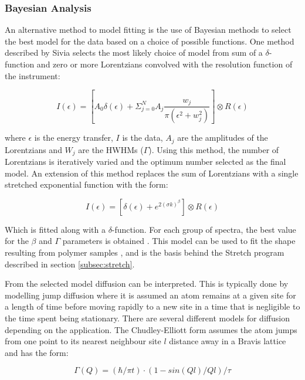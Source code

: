 \documentclass[paper=a4, fontsize=11pt]{scrartcl}	%
\numberwithin{equation}{section}															%
\numberwithin{figure}{section}																%
\numberwithin{table}{section}																%
\begin{document}
\subsubsection{Bayesian Analysis}
An alternative method to model fitting is the use of Bayesian methods to select the best model for the data based on a choice of possible functions. One method described by Sivia \cite{dssivia1992} selects the most likely choice of model from sum of a $\delta$-function and zero or more Lorentzians convolved with the resolution function of the instrument: 

\begin{equation}
I(\epsilon) = [A_0\delta(\epsilon) + \Sigma_{j=0}^N A_j \frac{w_j}{\pi(\epsilon^2 + w_j^2)}] \otimes R(\epsilon)
\end{equation}

where $\epsilon$ is the energy transfer, $I$ is the data, $A_j$ are the amplitudes of the Lorentzians and $W_j$ are the HWHMs ($\Gamma$). Using this method, the number of Lorentzians is iteratively varied and the optimum number selected as the final model. An extension of this method replaces the sum of Lorentzians with a single stretched exponential function with the form:

\begin{equation}
I(\epsilon) = [\delta(\epsilon) + e^{2(\sigma k)^\beta}] \otimes R(\epsilon)
\end{equation}

Which is fitted along with a $\delta$-function. For each group of spectra, the best value for the $\beta$ and $\Gamma$ parameters is obtained \cite{wshowells2010}. This model can be used to fit the shape resulting from polymer samples \cite{wshowells1996}\cite{higgins1977observation}\cite{higgins1977q},  and is the basis behind the Stretch program described in section \ref{subsec:stretch}.

From the selected model diffusion can be interpreted. This is typically done by modelling jump diffusion where it is assumed an atom remains at a given site for a length of time before moving rapidly to a new site in a time that is negligible to the time spent being stationary. There are several different models for diffusion depending on the application. The Chudley-Elliott form assumes the atom jumps from one point to its nearest neighbour site $l$ distance away in a Bravis lattice \cite{chudley1961neutron} and has the form:

\begin{equation}
\Gamma(Q) = (\hbar/\pi t) \cdot (1 - sin(Ql)/Ql)/\tau
\end{equation}
\end{document}

